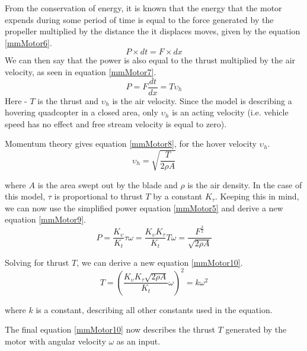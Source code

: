 From the conservation of energy, it is known that the energy that the motor expends during some period of time is equal to the force generated by the propeller multiplied by the distance the it displaces moves, given by the equation \ref{mmMotor6}.
\begin{equation}
\label{mmMotor6}
	P\times dt = F\times dx
\end{equation}
We can then say that the power is also equal to the thrust multiplied by the air velocity, as seen in equation \ref{mmMotor7}.
\begin{equation}
\label{mmMotor7}
	P = F\frac{dt}{dx} = T\upsilon _h
\end{equation}
Here - $T$ is the thrust and $\upsilon _h$ is the air velocity. Since the model is describing a hovering quadcopter in a closed area, only $\upsilon _h$ is an acting velocity (i.e. vehicle speed has no effect and free stream velocity is equal to zero).

Momentum theory gives equation \ref{mmMotor8}, for the hover velocity $\upsilon _h$.
\begin{equation}
\label{mmMotor8}
	\upsilon _h = \sqrt{\frac{T}{2\rho A}}
\end{equation}

where $A$ is the area swept out by the blade and $\rho$ is the air density.
In the case of this model, $\tau$ is proportional to thrust $T$ by a constant $K_\tau$. Keeping this in mind, we can now use the simplified power equation \ref{mmMotor5} and derive a new equation \ref{mmMotor9}.
\begin{equation}
\label{mmMotor9}
 	P = \frac{K_\upsilon }{K_t}\tau \omega = \frac{K_\upsilon K_\tau }{K_t}T\omega = \frac{F^{\frac{3}{2}}} {\sqrt{2\rho A}}
\end{equation}

Solving for thrust $T$, we can derive a new equation \ref{mmMotor10}.
\begin{equation}
\label{mmMotor10}
 	T = (\frac{K_\upsilon K_\tau \sqrt{2\rho A}}{K_t}\omega)^2 = k\omega ^2
\end{equation}

where $k$ is a constant, describing all other constants used in the equation.

The final equation \ref{mmMotor10} now describes the thrust $T$ generated by the motor with angular velocity $\omega$ as an input.